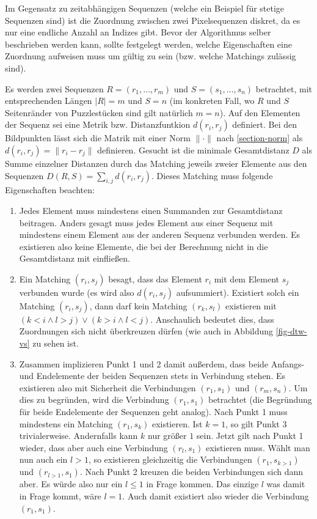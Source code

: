 \documentclass{whswinvcbook}
\begin{document}
Im Gegensatz zu zeitabhängigen Sequenzen (welche ein Beispiel für stetige Sequenzen sind) ist die Zuordnung zwischen zwei Pixelsequenzen diskret, da es nur eine endliche Anzahl an Indizes gibt. Bevor der Algorithmus selber beschrieben werden kann, sollte festgelegt werden, welche Eigenschaften eine Zuordnung aufweisen muss um gültig zu sein (bzw. welche Matchings zulässig sind).

Es werden zwei Sequenzen $R=(r_1,\dots,r_m)$ und $S=(s_1,\dots,s_n)$ betrachtet, mit entsprechenden Längen $|R|=m$ und $S=n$ (im konkreten Fall, wo $R$ und $S$ Seitenränder von Puzzlestücken sind gilt natürlich $m=n$). Auf den Elementen der Sequenz sei eine Metrik bzw. Distanzfuntkion $d(r_i,r_j)$ definiert. Bei den Bildpunkten lässt sich die Matrik mit einer Norm $\|\cdot\|$ nach \ref{section-norm} als $d(r_i,r_j)=\|r_i-r_j\|$ definieren. Gesucht ist die minimale Gesamtdistanz $D$ als Summe einzelner Distanzen durch das Matching jeweils zweier Elemente aus den Sequenzen $D(R,S)=\sum_{i,j}d(r_i,r_j)$. Dieses Matching muss folgende Eigenschaften beachten:
\begin{enumerate}
    \item Jedes Element muss mindestens einen Summanden zur Gesamtdistanz beitragen. Anders gesagt muss jedes Element aus einer Sequenz mit mindestens einem Element aus der anderen Sequenz verbunden werden. Es existieren also keine Elemente, die bei der Berechnung nicht in die Gesamtdistanz mit einfließen.
    \item Ein Matching $(r_i,s_j)$ besagt, dass das Element $r_i$ mit dem Element $s_j$ verbunden wurde (es wird also $d(r_i,s_j)$ aufsummiert). Existiert solch ein Matching $(r_i,s_j)$, dann darf kein Matching $(r_k,s_l)$ existieren mit $(k<i\land l>j)\lor (k>i\land l<j)$. Anschaulich bedeutet dies, dass Zuordnungen sich nicht überkreuzen dürfen (wie auch in Abbildung \ref{fig-dtw-vs} zu sehen ist.
    \item Zusammen implizieren Punkt 1 und 2 damit außerdem, dass beide Anfangs- und Endelemente der beiden Sequenzen stets in Verbindung stehen. Es existieren also mit Sicherheit die Verbindungen $(r_1,s_1)$ und $(r_m,s_n)$. Um dies zu begründen, wird die Verbindung $(r_1,s_1)$ betrachtet (die Begründung für beide Endelemente der Sequenzen geht analog). Nach Punkt 1 muss mindestens ein Matching $(r_1,s_k)$ existieren. Ist $k=1$, so gilt Punkt 3 trivialerweise. Andernfalls kann $k$ nur größer $1$ sein. Jetzt gilt nach Punkt 1 wieder, dass aber auch eine Verbindung $(r_l,s_1)$ existieren muss. Wählt man nun auch ein $l>1$, so existieren gleichzeitig die Verbindungen $(r_1,s_{k>1})$ und $(r_{l>1},s_1)$. Nach Punkt 2 kreuzen die beiden Verbindungen sich dann aber. Es würde also nur ein $l\leq1$ in Frage kommen. Das einzige $l$ was damit in Frage kommt, wäre $l=1$. Auch damit existiert also wieder die Verbindung $(r_1,s_1)$.
\end{enumerate}
\end{document}
